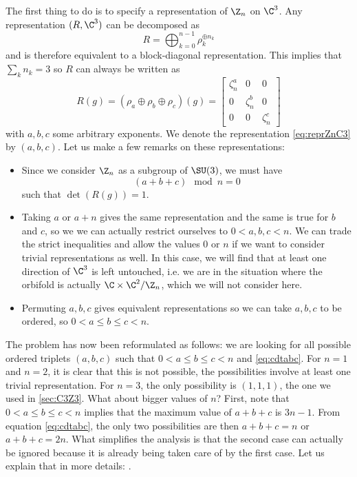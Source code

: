 \documentclass{worksheetclass}
\begin{document}
            The first thing to do is to specify a representation of $\Z_n$ on $\C^3$. Any representation $(R,\C^3)$ can be decomposed as
            \begin{equation}
                R=\bigoplus^{n-1}_{k=0} \rho^{\oplus n_k}_k
            \end{equation}
            and is therefore equivalent to a block-diagonal representation. This implies that $\sum_kn_k=3$ so $R$ can always be written as
            \begin{equation}
                R(g)= (\rho_a\oplus\rho_b\oplus\rho_c)(g)=
                \begin{bmatrix}
                    \zeta^a_n & 0 & 0 \\
                    0 & \zeta^b_n & 0 \\
                    0 & 0 & \zeta^c_n
                \end{bmatrix}\label{eq:reprZnC3}
            \end{equation}
            with $a,b,c$ some arbitrary exponents. We denote the representation \eqref{eq:reprZnC3} by $(a,b,c)$. Let us make a few remarks on these representations:
            \begin{itemize}
                \item Since we consider $\Z_n$ as a subgroup of $\SU(3)$, we must have
                \begin{equation}
                    (a+b+c)\mod n = 0\label{eq:cdtabc}
                \end{equation}
                such that $\det(R(g))=1$.
                \item Taking $a$ or $a+n$ gives the same representation and the same is true for $b$ and $c$, so we we can actually restrict ourselves to $0<a,b,c<n$. We can trade the strict inequalities and allow the values $0$ or $n$ if we want to consider trivial representations as well. In this case, we will find that at least one direction of $\C^3$ is left untouched, i.e. we are in the situation where the orbifold is actually $\C\times\C^2/\Z_n$, which we will not consider here.
                \item Permuting $a,b,c$ gives equivalent representations so we can take $a,b,c$ to be ordered, so $0<a\leq b\leq c<n$.
            \end{itemize}

            The problem has now been reformulated as follows:
            we are looking for all possible ordered triplets $(a,b,c)$ such that $0<a\leq b\leq c<n$ and \eqref{eq:cdtabc}. For $n=1$ and $n=2$, it is clear that this is not possible, the possibilities involve at least one trivial representation. For $n=3$, the only possibility is $(1,1,1)$, the one we used in \ref{sec:C3Z3}. What about bigger values of $n$? First, note that $0<a\leq b\leq c<n$ implies that the maximum value of $a+b+c$ is $3n-1$. From equation \eqref{eq:cdtabc}, the only two possibilities are then $a+b+c=n$ or $a+b+c=2n$. What simplifies the analysis is that the second case can actually be ignored because it is already being taken care of by the first case. Let us explain that in more details: .
            
\end{document}
